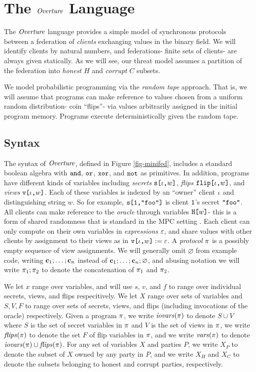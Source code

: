\section{The $\mathit{Overture}$ Language}
\label{section-minicat}

The $\mathit{Overture}$ language provides a simple model of synchronous
protocols between a federation of \emph{clients} exchanging values in
the binary field. We will identify clients by natural numbers, and
federations- finite sets of clients- are always given statically.
As we will see, our threat model assumes a partition of the federation
into \emph{honest} $H$ and \emph{corrupt} $C$ subsets.

We model probabilistic programming via the \emph{random tape}
approach. That is, we will assume that programs can make reference to
values chosen from a uniform random distribution- coin ``flips''- via
values arbitrarily assigned in the initial program memory.  Programs
execute deterministically given the random tape. 

\subsection{Syntax} The syntax of $\mathit{Overture}$, defined in
Figure \ref{fig-minifed}, includes a standard boolean algebra
with $\texttt{and}$, $\texttt{or}$, $\texttt{xor}$, and $\texttt{not}$ as primitives. In addition,
programs have different kinds of variables including \emph{secrets}
$\texttt{s[}\iota\texttt{,}w\texttt{]}$, \emph{flips} $\texttt{flip[}\iota\texttt{,}w\texttt{]}$, and \emph{views}
$\texttt{v[}\iota\texttt{,}w\texttt{]}$.  Each of these variables is indexed by an ``owner''
client $\iota$ and distinguishing string $w$. So for example,
$\texttt{s[}\texttt{1}\texttt{,}\texttt{"foo"}\texttt{]}$ is client $\texttt{1}$'s secret 
$\texttt{"foo"}$. All clients can make reference to the \emph{oracle}
through variables $\texttt{H[}w\texttt{]}$- this is a form of shared randomness
that is standard in the MPC setting \cite{evans2018pragmatic}.  Each client can only
compute on their own variables in \emph{expressions} $\varepsilon$, and share
values with other clients by assignment to their views as in
$\texttt{v[}\iota\texttt{,}w\texttt{]} := \varepsilon$.  A \emph{protocol} $\pi$ is a
possibly empty sequence of view assignments. We will generally omit
$\varnothing$ from example code, writing $\mathbf{c}_1;\ldots;\mathbf{c}_n$
instead of $\mathbf{c}_1;\ldots;\mathbf{c}_n;\varnothing$, and abusing notation we will
write $\pi_1;\pi_2$ to denote the concatenation of $\pi_1$
and $\pi_2$.

We let $x$ range over variables, and will use $s$, $v$, and $f$ to
range over individual secrets, views, and flips respecitively. We let
$X$ range over sets of variables and $S,V,F$ to range over sets of
secrets, views, and flips (including invocations of the oracle)
respectively. Given a program $\pi$, we write $\mathit{iovars}(\pi)$ to
denote $S \cup V$ where $S$ is the set of secret variables in $\pi$
and $V$ is the set of views in $\pi$, we write $\mathit{flips}(\pi)$ to
denote the set $F$ of flip variables in $\pi$, and we write
$\mathit{vars}(\pi)$ to denote $\mathit{iovars}(\pi) \cup \mathit{flips}(\pi)$. For any set
of variables $X$ and parties $P$, we write $X_P$ to denote the subset
of $X$ owned by any party in $P$, and we write $X_H$ and $X_C$ to
denote the subsets belonging to honest and corrupt parties,
respectively.

